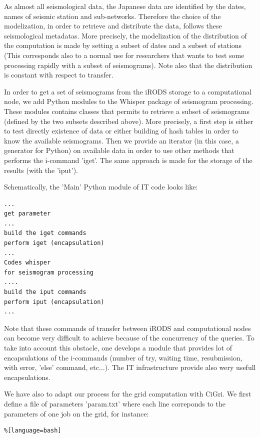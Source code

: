 \documentclass[a4paper, 10pt]{article}
\begin{document}
\begin{multicols}{2}
As almost all seismological data, the Japanese data are identified by the dates, names of seismic station and sub-networks. Therefore
the choice of the modelization, in order to retrieve and distribute the data, follows these seismological metadatas.
More precisely, the modelization of the distribution of the computation is made by setting a subset of dates and a subset of stations 
(This corresponds also to a normal use for researchers that wants to test some processing rapidly with a subset of seismograms).
Note also that the distribution is constant with respect to transfer.


In order to get a set of seismograms from the iRODS storage  to a computational node, we add Python modules to the Whisper package of seismogram processing.
These modules contains classes that permits to retrieve a subset of seismograms (defined by the two subsets described above). More precisely, a first step is either to test directly existence of data or either building of hash tables in order to know the available seismograms.
Then we provide an iterator (in this case, a generator for Python) on available data in order to use other methods that performs the i-command
'iget'. The same approach is made for the storage of the results (with the 'iput').

Schematically, the 'Main' Python module of IT code looks like:

\begin{lstlisting}
...
get parameter
...
build the iget commands
perform iget (encapsulation)
...
Codes whisper 
for seismogram processing 
....
build the iput commands
perform iput (encapsulation)
...

\end{lstlisting}

Note that these commands of transfer between iRODS and computational nodes can become very difficult to achieve because of the concurrency of the queries.
To take into account this obstacle, one develops a module that provides lot of encapsulations of the i-commands (number of try, waiting time,
resubmission, with error, 'else' command,  etc...). The IT infrastructure provide also wery usefull encapsulations.


We have also to adapt our process for the grid computation with CiGri. We first define a file of parameters 'param.txt' where
each line correponds to the parameters of one job on the grid, for instance:

\begin{lstlisting}%[language=bash]


\end{lstlisting}
\end{multicols}
\end{document}
